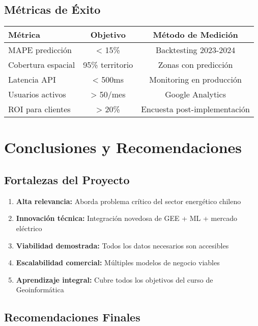\documentclass[12pt,a4paper]{article}
\begin{document}
\subsection{Métricas de Éxito}

\begin{center}
\begin{tabular}{|l|c|c|}
\hline
\textbf{Métrica} & \textbf{Objetivo} & \textbf{Método de Medición} \\
\hline
MAPE predicción & < 15\% & Backtesting 2023-2024 \\
Cobertura espacial & 95\% territorio & Zonas con predicción \\
Latencia API & < 500ms & Monitoring en producción \\
Usuarios activos & > 50/mes & Google Analytics \\
ROI para clientes & > 20\% & Encuesta post-implementación \\
\hline
\end{tabular}
\end{center}

\section{Conclusiones y Recomendaciones}

\subsection{Fortalezas del Proyecto}

\begin{enumerate}
    \item \textbf{Alta relevancia:} Aborda problema crítico del sector energético chileno
    \item \textbf{Innovación técnica:} Integración novedosa de GEE + ML + mercado eléctrico
    \item \textbf{Viabilidad demostrada:} Todos los datos necesarios son accesibles
    \item \textbf{Escalabilidad comercial:} Múltiples modelos de negocio viables
    \item \textbf{Aprendizaje integral:} Cubre todos los objetivos del curso de Geoinformática
\end{enumerate}

\subsection{Recomendaciones Finales}
\end{document}
